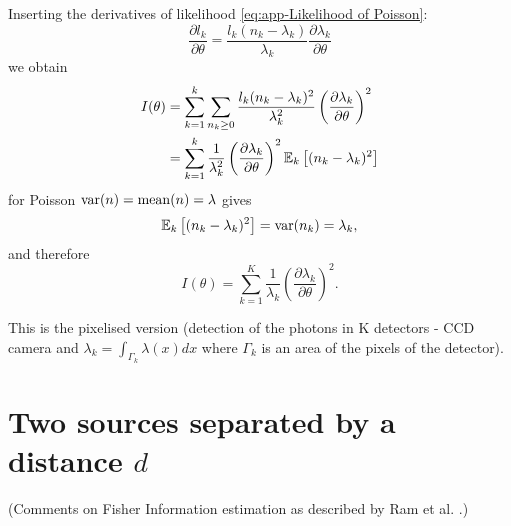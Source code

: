 Inserting the derivatives of likelihood \autoref{eq:app-Likelihood of Poisson}: 
%
\begin{equation}
	\frac{\partial l_k}{\partial\theta}=\frac{l_k(n_k-\lambda_k)}{\lambda_k}\frac{\partial\lambda_k}{\partial\theta}
\end{equation}
%
we obtain
%
\begin{align*}
	I(\theta) 
	& =\sum_{k=1}^k\sum_{n_k\geq0}\frac{l_k(n_k-\lambda_k)^2}{\lambda_k^2}\left(\frac{\partial\lambda_k}{\partial\theta}\right)^2\\
	& =\sum_{k=1}^k\frac{1}{\lambda_k^2}\left(\frac{\partial\lambda_k}{\partial\theta}\right)^2\mathbb{E}_k\left[(n_k-\lambda_k)^2\right]
\end{align*}
%
for Poisson $\mathrm{var}(n)=\mathrm{mean}(n)=\lambda$ gives 
%
\begin{equation}
	\mathbb{E}_k\left[(n_k-\lambda_k)^2\right]=\mathrm{var}(n_k)=\lambda_k,
\end{equation}
%
and therefore
%
\begin{equation}
	I(\theta)=\sum_{k=1}^K\frac{1}{\lambda_k}\left(\frac{\partial\lambda_k}{\partial\theta}\right)^2.
	\label{eq:app-Fisher Info for Poisson}   	  
\end{equation}

This is the pixelised version (detection of the photons in K detectors - CCD camera and $\lambda_k=\int_{\Gamma_k}\lambda(x)dx$ where $\Gamma_k$ is an area of the pixels of the detector). 

\clearpage{}
\section{Two sources separated by a distance $d$\label{sub:Two-sources-separated}}
(Comments on Fisher Information estimation as described by Ram et al. \cite{Ram2006}.)


